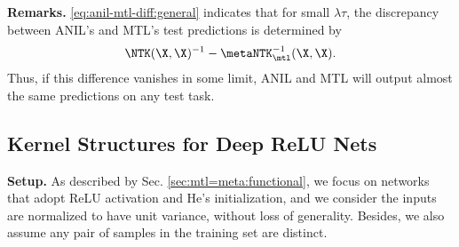 \documentclass{article}
\begin{document}
\textbf{Remarks.} \eqref{eq:anil-mtl-diff:general} indicates that for small $\lambda \tau$, the discrepancy between ANIL's and MTL's test predictions is determined by 
\begin{align}\label{eq:ntk-mtl-inv-diff}
\NTK(\X,\X)^{-1} - \metaNTK_\mtl^{-1}(\X,\X).    
\end{align}
Thus, if this difference vanishes in some limit, ANIL and MTL will output almost the same predictions on any test task.

\subsection{Kernel Structures for Deep ReLU Nets}\label{supp:proof:relu-kernel-structures}

\textbf{Setup.} As described by Sec. \ref{sec:mtl=meta:functional}, we focus on networks that adopt ReLU activation and He's initialization, and we consider the inputs are normalized to have unit variance, without loss of generality. Besides, we also assume any pair of samples in the training set are distinct.
\end{document}
